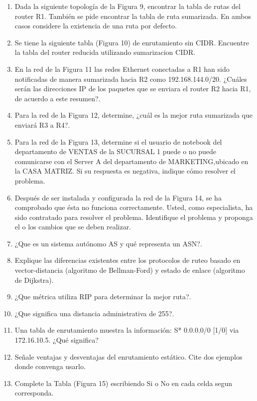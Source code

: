 \documentclass{udparticle}
\begin{document}
\begin{enumerate}
\item Dada la siguiente topología de la Figura 9, encontrar la tabla de rutas del 
router R1. También se pide encontrar la tabla de ruta sumarizada. En ambos casos 
considere la existencia de una ruta por defecto.

\item Se tiene la siguiente tabla (Figura 10) de enrutamiento sin CIDR. Encuentre 
la tabla del router reducida utilizando sumarizacion CIDR.
\item En la red de la Figura 11 las redes Ethernet conectadas a R1 han sido 
notificadas de manera sumarizada hacia R2 como 192.168.144.0/20. ¿Cuáles serán 
las direcciones IP de los paquetes que se enviara el router R2 hacia R1, de acuerdo a este resumen?.
\item Para la red de la Figura 12, determine, ¿cuál es la mejor ruta sumarizada que
enviará R3 a R4?. 

\item Para la red de la Figura 13, determine si el usuario de notebook del 
departamento de VENTAS de la SUCURSAL 1 puede o no puede comunicarse con el Server 
A del departamento de MARKETING,ubicado en la CASA MATRIZ. Si su respuesta es 
negativa, indique cómo resolver el problema.

\item Después de ser instalada y configurada la red de la Figura 14, se ha 
comprobado que ésta no funciona correctamente. Usted, como especialista, ha sido 
contratado para resolver el problema. Identifique el problema y proponga el o los 
cambios que se deben realizar.

\item ¿Que es un sistema autónomo AS y qué representa un ASN?.
\item Explique las diferencias existentes entre los protocolos de ruteo basado en
vector-distancia (algoritmo de Bellman-Ford) y estado de enlace (algoritmo de Dijkstra).

\item ¿Que métrica utiliza RIP para determinar la mejor ruta?.
\item ¿Que significa una distancia administrativa de 255?.
\item Una tabla de enrutamiento muestra la información: S* 0.0.0.0/0 [1/0] via 172.16.10.5. ¿Qué significa?
\item Señale ventajas y desventajas del enrutamiento estático. Cite dos ejemplos donde convenga usarlo.
\item Complete la Tabla (Figura 15) escribiendo Si o No en cada celda segun corresponda.


\end{enumerate}
\end{document}
